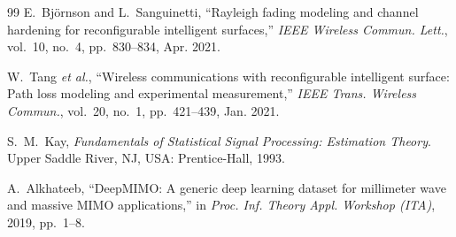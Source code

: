 \documentclass[journal]{IEEEtran}
\begin{document}
\begin{thebibliography}{99}
E.~Bj\"{o}rnson and L.~Sanguinetti, ``Rayleigh fading modeling and channel hardening for reconfigurable intelligent surfaces,'' \emph{IEEE Wireless Commun. Lett.}, vol.~10, no.~4, pp.~830--834, Apr. 2021.

W.~Tang \emph{et al.}, ``Wireless communications with reconfigurable intelligent surface: Path loss modeling and experimental measurement,'' \emph{IEEE Trans. Wireless Commun.}, vol.~20, no.~1, pp.~421--439, Jan. 2021.

S.~M.~Kay, \emph{Fundamentals of Statistical Signal Processing: Estimation Theory}. Upper Saddle River, NJ, USA: Prentice-Hall, 1993.

A.~Alkhateeb, ``DeepMIMO: A generic deep learning dataset for millimeter wave and massive MIMO applications,'' in \emph{Proc. Inf. Theory Appl. Workshop (ITA)}, 2019, pp.~1--8.

\end{thebibliography}
\end{document}
